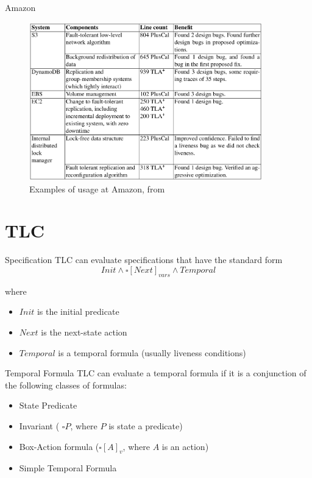 \begin{frame}[plain]{Amazon}
    \begin{figure}
        \includegraphics[width=0.9\textwidth]{images/amazon.png}
        \caption{\footnotesize Examples of \tlap usage at Amazon, from} %
    \end{figure}
\end{frame}

\section[image=bgphoto_cut]{TLC}
\begin{frame}[plain]{}
    \sectionpage
\end{frame}

\begin{frame}{Specification}
    TLC can evaluate specifications that have the standard form
    \[
        Init \land \square \left[ Next \right]_{vars} \land Temporal
    \]

    where
    \begin{itemize}
        \item $Init$ is the initial predicate
        \item $Next$ is the next-state action
        \item $Temporal$ is a temporal formula (usually liveness conditions)
    \end{itemize}

\end{frame}

\begin{frame}{Temporal Formula}
    TLC can evaluate a temporal formula if it is a conjunction of the following classes of formulas:
    \begin{itemize}
        \item State Predicate
        \item Invariant ( $\square P$, where $P$ is state a predicate)
        \item Box-Action formula ($\square[A]_v$, where $A$ is an action)
        \item Simple Temporal Formula
    \end{itemize}
\end{frame}

